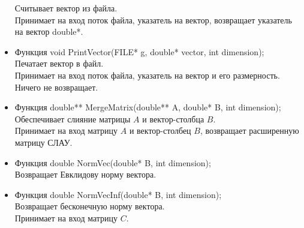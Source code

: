 \documentclass[12pt]{article}
\begin{document}
\begin{itemize}
Считывает вектор из файла.\\
Принимает на вход поток файла, указатель на вектор, возвращает указатель на вектор double*.\\
\item  Функция void PrintVector(FILE* g, double* vector, int dimension);\\
Печатает вектор в файл.\\
Принимает на вход поток файла, указатель на вектор и его размерность. Ничего не возвращает.
\item Функция double** MergeMatrix(double** A, double* B, int dimension);\\
Обеспечивает слияние матрицы $A$ и вектор-столбца $B$.\\
Принимает на вход матрицу $A$ и вектор-столбец $B$,  возвращает расширенную матрицу СЛАУ.\\
\item Функция double NormVec(double* B, int dimension);\\
Возвращает Евклидову норму вектора.\\ 
\item Функция double NormVecInf(double* B, int dimension);\\
Возвращает бесконечную норму вектора.\\ 
Принимает на вход матрицу $C$.


\end{itemize}
\end{document}
